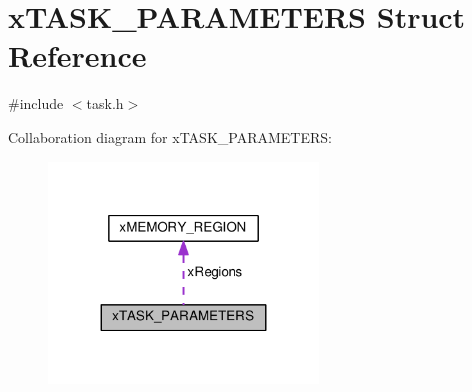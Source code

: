 \hypertarget{structx_t_a_s_k___p_a_r_a_m_e_t_e_r_s}{}\section{x\+T\+A\+S\+K\+\_\+\+P\+A\+R\+A\+M\+E\+T\+E\+RS Struct Reference}
\label{structx_t_a_s_k___p_a_r_a_m_e_t_e_r_s}


{\ttfamily \#include $<$task.\+h$>$}



Collaboration diagram for x\+T\+A\+S\+K\+\_\+\+P\+A\+R\+A\+M\+E\+T\+E\+RS\+:\nopagebreak
\begin{figure}[H]
\begin{center}
\leavevmode
\includegraphics[width=203pt]{structx_t_a_s_k___p_a_r_a_m_e_t_e_r_s__coll__graph}
\end{center}
\end{figure}
